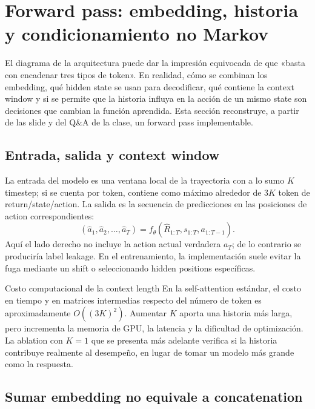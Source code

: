\section{Forward pass: embedding, historia y condicionamiento no Markov}

El diagrama de la arquitectura puede dar la impresión equivocada de que «basta con encadenar tres tipos de token». En realidad, cómo se combinan los embedding, qué hidden state se usan para decodificar, qué contiene la context window y si se permite que la historia influya en la acción de un mismo state son decisiones que cambian la función aprendida. Esta sección reconstruye, a partir de las slide y del Q\&A de la clase, un forward pass implementable.

\subsection{Entrada, salida y context window}

La entrada del modelo es una ventana local de la trayectoria con a lo sumo $K$ timestep; si se cuenta por token, contiene como máximo alrededor de $3K$ token de return/state/action. La salida es la secuencia de predicciones en las posiciones de action correspondientes:
\[
(\widehat{a}_1,\widehat{a}_2,\ldots,\widehat{a}_T)
=f_{\theta}(\widehat{R}_{1:T},s_{1:T},a_{1:T-1}).
\]
Aquí el lado derecho no incluye la action actual verdadera $a_T$; de lo contrario se produciría label leakage. En el entrenamiento, la implementación suele evitar la fuga mediante un shift o seleccionando hidden positions específicas.


\begin{importantbox}{Costo computacional de la context length}
En la self-attention estándar, el costo en tiempo y en matrices intermedias respecto del número de token es aproximadamente $O((3K)^2)$. Aumentar $K$ aporta una historia más larga, pero incrementa la memoria de GPU, la latencia y la dificultad de optimización. La ablation con $K=1$ que se presenta más adelante verifica si la historia contribuye realmente al desempeño, en lugar de tomar un modelo más grande como la respuesta.
\end{importantbox}

\subsection{Sumar embedding no equivale a concatenation}

